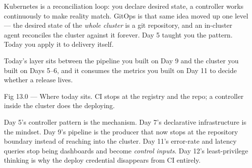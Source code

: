 \begin{keyidea}
Kubernetes is a reconciliation loop: you declare desired state, a controller works continuously to make reality match. GitOps is that same idea moved up one level --- the desired state of the \emph{whole cluster} is a git repository, and an in-cluster agent reconciles the cluster against it forever. Day 5 taught you the pattern. Today you apply it to delivery itself.
\end{keyidea}

 Today's layer sits between the pipeline you built on Day 9 and the cluster you built on Days 5--6, and it consumes the metrics you built on Day 11 to decide whether a release lives.

\begin{wbfigure}{Fig 13.0 — Where today sits. CI stops at the registry and the repo; a controller inside the cluster does the deploying.}
\end{wbfigure}

 Day 5's controller pattern is the mechanism. Day 7's declarative infrastructure is the mindset. Day 9's pipeline is the producer that now stops at the repository boundary instead of reaching into the cluster. Day 11's error-rate and latency queries stop being dashboards and become \emph{control inputs}. Day 12's least-privilege thinking is why the deploy credential disappears from CI entirely.

